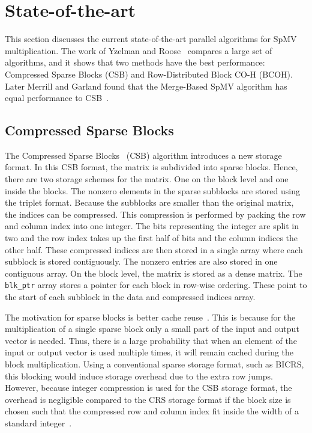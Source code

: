 \documentclass{siamart220329}
\begin{document}


\section{State-of-the-art}\label{sec:earlywork}
This section discusses the current state-of-the-art parallel algorithms for SpMV multiplication. The work of Yzelman and Roose~\cite{high-level-SpMV} compares a large set of algorithms, and it shows that two methods have the best performance: Compressed Sparse Blocks (CSB) and Row-Distributed Block CO-H (BCOH). Later Merrill and Garland found that the Merge-Based SpMV algorithm has equal performance to CSB~\cite{SpMV-merge}.

\subsection{Compressed Sparse Blocks}
The Compressed Sparse Blocks~\cite{SpMV-CSB} (CSB) algorithm introduces a new storage format. In this CSB format, the matrix is subdivided into sparse blocks. Hence, there are two storage schemes for the matrix. One on the block level and one inside the blocks. The nonzero elements in the sparse subblocks are stored using the triplet format. Because the subblocks are smaller than the original matrix, the indices can be compressed. This compression is performed by packing the row and column index into one integer. The bits representing the integer are split in two and the row index takes up the first half of bits and the column indices the other half. These compressed indices are then stored in a single array where each subblock is stored contiguously. The nonzero entries are also stored in one contiguous array. On the block level, the matrix is stored as a dense matrix. The \texttt{blk\_ptr} array stores a pointer for each block in row-wise ordering. These point to the start of each subblock in the data and compressed indices array.

The motivation for sparse blocks is better cache reuse~\cite{SBD}. This is because for the multiplication of a single sparse block only a small part of the input and output vector is needed. Thus, there is a large probability that when an element of the input or output vector is used multiple times, it will remain cached during the block multiplication. Using a conventional sparse storage format, such as BICRS, this blocking would induce storage overhead due to the extra row jumps. However, because integer compression is used for the CSB storage format, the overhead is negligible compared to the CRS storage format if the block size is chosen such that the compressed row and column index fit inside the width of a standard integer~\cite{SpMV-CSB}.
\end{document}
